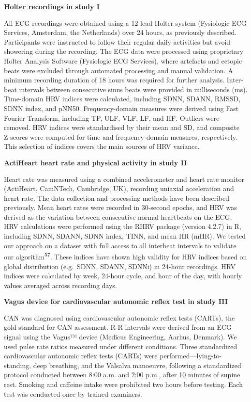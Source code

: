 \documentclass[
  a4paper,
  headsepline=true,
  open=any]{scrbook}
\begin{document}
\textbf{Holter recordings in study I}

All ECG recordings were obtained using a 12-lead Holter system
(Fysiologic ECG Services, Amsterdam, the Netherlands) over 24 hours, as
previously described. Participants were instructed to follow their
regular daily activities but avoid showering during the recording. The
ECG data were processed using proprietary Holter Analysis Software
(Fysiologic ECG Services), where artefacts and ectopic beats were
excluded through automated processing and manual validation. A minimum
recording duration of 18 hours was required for further analysis.
Inter-beat intervals between consecutive sinus beats were provided in
milliseconds (ms). Time-domain HRV indices were calculated, including
SDNN, SDANN, RMSSD, SDNN index, and pNN50. Frequency-domain measures
were derived using Fast Fourier Transform, including TP, ULF, VLF, LF,
and HF. Outliers were removed. HRV indices were standardised by their
mean and SD, and composite Z-scores were computed for time and
frequency-domain measures, respectively. This selection of indices
covers the main sources of HRV variance.

\textbf{ActiHeart heart rate and physical activity in study II}

Heart rate was measured using a combined accelerometer and heart rate
monitor (ActiHeart, CamNTech, Cambridge, UK), recording uniaxial
acceleration and heart rate. The data collection and processing methods
have been described previously. Mean heart rates were recorded in
30-second epochs, and HRV was derived as the variation between
consecutive normal heartbeats on the ECG. HRV calculations were
performed using the RHRV package (version 4.2.7) in R, including SDNN,
SDANN, SDNN index, TINN, and mean HR (mHR). We tested our approach on a
dataset with full access to all interbeat intervals to validate our
algorithm\textsuperscript{57}. These indices have shown high validity
for HRV indices based on global distribution (e.g.~SDNN, SDANN, SDNNi)
in 24-hour recordings. HRV indices were calculated by week, 24-hour
cycle, and hour of the day, with hourly values averaged across recording
days.

\textbf{Vagus device for cardiovascular autonomic reflex test in study
III}

CAN was diagnosed using cardiovascular autonomic reflex tests (CARTs),
the gold standard for CAN assessment. R-R intervals were derived from an
ECG signal using the Vagus™ device (Medicus Engineering, Aarhus,
Denmark). We used pulse rate ratios measured under different conditions.
Three standardized cardiovascular autonomic reflex tests (CARTs) were
performed---lying-to-standing, deep breathing, and the Valsalva
manoeuvre, following a standardized protocol conducted between 8:00 a.m.
and 2:00 p.m., after 10 minutes of supine rest. Smoking and caffeine
intake were prohibited two hours before testing. Each test was conducted
once by trained examiners.
\end{document}
